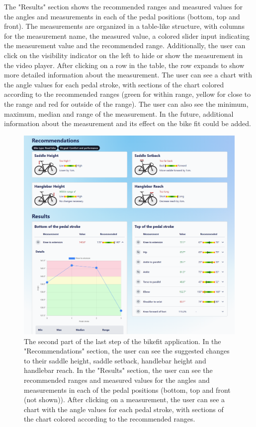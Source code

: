 The "Results" section shows the recommended ranges and measured values for the angles and measurements in each of the pedal positions (bottom, top and front). The measurements are organized in a table-like structure, with columns for the measurement name, the measured value, a colored slider input indicating the measurement value and the recommended range. Additionally, the user can click on the visibility indicator on the left to hide or show the measurement in the video player. After clicking on a row in the table, the row expands to show more detailed information about the measurement. The user can see a chart with the angle values for each pedal stroke, with sections of the chart colored according to the recommended ranges (green for within range, yellow for close to the range and red for outside of the range). The user can also see the minimum, maximum, median and range of the measurement. In the future, additional information about the measurement and its effect on the bike fit could be added.

\begin{figure}[htbp]
    \centering
    \includegraphics[width=\textwidth]{obrazky-figures/step3-bot-crop.png}
    \caption{The second part of the last step of the bikefit application. In the "Recommendations" section, the user can see the suggested changes to their saddle height, saddle setback, handlebar height and handlebar reach. In the "Results" section, the user can see the recommended ranges and measured values for the angles and measurements in each of the pedal positions (bottom, top and front (not shown)). After clicking on a measurement, the user can see a chart with the angle values for each pedal stroke, with sections of the chart colored according to the recommended ranges.}
    \label{fig:step3-bottom}
\end{figure}





